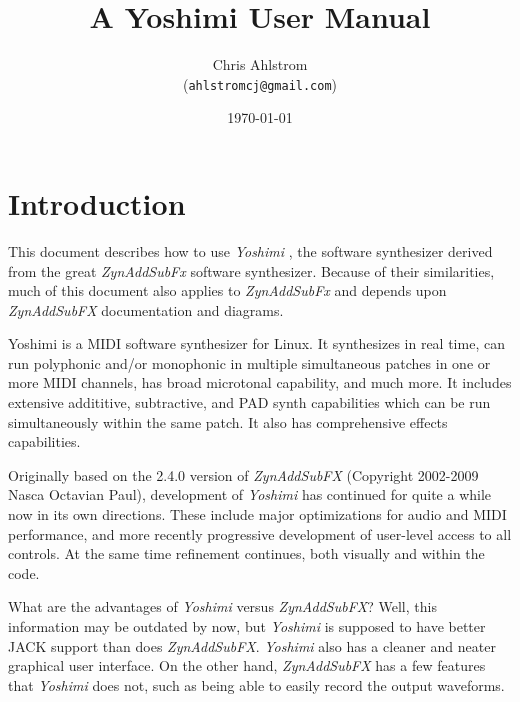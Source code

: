 \documentclass[
 11pt,
 twoside,
 a4paper,
 headinclude,
 footinclude,
 final                                 %
]{article}
\begin{document}
\title{A Yoshimi User Manual}
\author{Chris Ahlstrom\\
   (\texttt{ahlstromcj@gmail.com})}
\date{\today}
\maketitle
\tableofcontents
\listoffigures                         %
\listoftables                          %


\setlength{\parindent}{0pt}
\setlength{\parskip}{1ex plus 0.5ex minus 0.2ex}

\section{Introduction}
\label{sec:introduction}

   This document describes how to use \textsl{Yoshimi} \cite{yoshimi},
   the software synthesizer derived from the great
   \textsl{ZynAddSubFx} \cite{zynaddsubfx} software
   synthesizer.  Because of their similarities, much of this document also
   applies to \textsl{ZynAddSubFx} and depends upon \textsl{ZynAddSubFX}
   documentation and diagrams.

   Yoshimi is a MIDI software synthesizer for Linux. It synthesizes in real
   time, can run polyphonic and/or monophonic in multiple simultaneous
   patches in one or more MIDI channels, has broad microtonal capability,
   and much more. It includes extensive addititive, subtractive, and PAD
   synth capabilities which can be run simultaneously within the same patch.
   It also has comprehensive effects capabilities.

   Originally based on the 2.4.0 version of \textsl{ZynAddSubFX} (Copyright
   2002-2009 Nasca Octavian Paul), development of \textsl{Yoshimi} has
   continued for quite a while now in its own directions. These include
   major optimizations for audio and MIDI performance, and more recently
   progressive development of user-level access to all controls. At the same
   time refinement continues, both visually and within the code.

   What are the advantages of
   \textsl{Yoshimi} versus \textsl{ZynAddSubFX}?
   Well, this information may be outdated by now, but 
   \textsl{Yoshimi} is supposed to have better JACK support
   than does \textsl{ZynAddSubFX}.
   \textsl{Yoshimi} also has a cleaner and neater graphical user interface.
   On the other hand, \textsl{ZynAddSubFX} has a few features that
   \textsl{Yoshimi} does not, such as being able to easily record
   the output waveforms.
\end{document}
